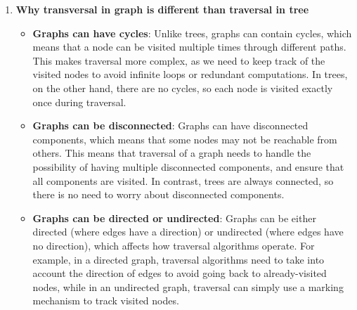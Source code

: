 \documentclass[11pt]{article}
\begin{document}
\begin{enumerate}
\item \textbf{Why transversal in graph is different than traversal in tree}\\

\begin{itemize}
    \item \textbf{Graphs can have cycles}: Unlike trees, graphs can contain cycles, which means that a node can be visited multiple times through different paths. This makes traversal more complex, as we need to keep track of the visited nodes to avoid infinite loops or redundant computations. In trees, on the other hand, there are no cycles, so each node is visited exactly once during traversal.

    \item \textbf{Graphs can be disconnected}: Graphs can have disconnected components, which means that some nodes may not be reachable from others. This means that traversal of a graph needs to handle the possibility of having multiple disconnected components, and ensure that all components are visited. In contrast, trees are always connected, so there is no need to worry about disconnected components.
    
    \item \textbf{Graphs can be directed or undirected}: Graphs can be either directed (where edges have a direction) or undirected (where edges have no direction), which affects how traversal algorithms operate. For example, in a directed graph, traversal algorithms need to take into account the direction of edges to avoid going back to already-visited nodes, while in an undirected graph, traversal can simply use a marking mechanism to track visited nodes.
\end{itemize}

\end{enumerate}
\end{document}
